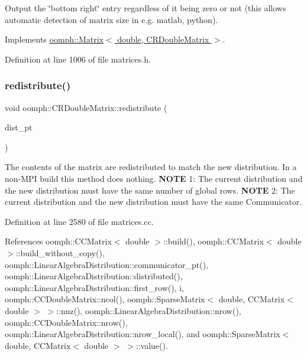 Output the \char`\"{}bottom right\char`\"{} entry regardless of it being zero or not (this allows automatic detection of matrix size in e.\+g. matlab, python). 



Implements \hyperlink{classoomph_1_1Matrix_a10ee338f4d3893010291a692aea04248}{oomph\+::\+Matrix$<$ double, C\+R\+Double\+Matrix $>$}.



Definition at line 1006 of file matrices.\+h.

\mbox{\label{classoomph_1_1CRDoubleMatrix_a9ba295a04e08e3153ae06bc0556f507d}} 
\subsubsection{\texorpdfstring{redistribute()}{redistribute()}}
{\footnotesize\ttfamily void oomph\+::\+C\+R\+Double\+Matrix\+::redistribute (\begin{DoxyParamCaption}\item[{const \hyperlink{classoomph_1_1LinearAlgebraDistribution}{Linear\+Algebra\+Distribution} $\ast$const \&}]{dist\+\_\+pt }\end{DoxyParamCaption})}

The contents of the matrix are redistributed to match the new distribution. In a non-\/\+M\+PI build this method does nothing. {\bfseries N\+O\+TE} 1\+: The current distribution and the new distribution must have the same number of global rows. {\bfseries N\+O\+TE} 2\+: The current distribution and the new distribution must have the same Communicator. 

Definition at line 2580 of file matrices.\+cc.



References oomph\+::\+C\+C\+Matrix$<$ double $>$\+::build(), oomph\+::\+C\+C\+Matrix$<$ double $>$\+::build\+\_\+without\+\_\+copy(), oomph\+::\+Linear\+Algebra\+Distribution\+::communicator\+\_\+pt(), oomph\+::\+Linear\+Algebra\+Distribution\+::distributed(), oomph\+::\+Linear\+Algebra\+Distribution\+::first\+\_\+row(), i, oomph\+::\+C\+C\+Double\+Matrix\+::ncol(), oomph\+::\+Sparse\+Matrix$<$ double, C\+C\+Matrix$<$ double $>$ $>$\+::nnz(), oomph\+::\+Linear\+Algebra\+Distribution\+::nrow(), oomph\+::\+C\+C\+Double\+Matrix\+::nrow(), oomph\+::\+Linear\+Algebra\+Distribution\+::nrow\+\_\+local(), and oomph\+::\+Sparse\+Matrix$<$ double, C\+C\+Matrix$<$ double $>$ $>$\+::value().



